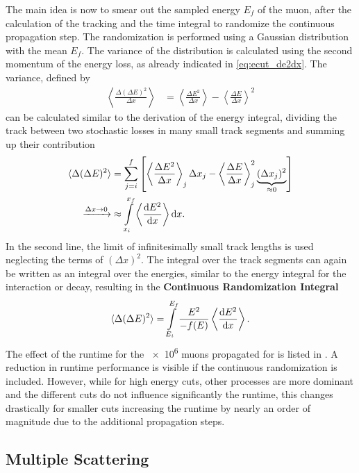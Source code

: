 The main idea is now to smear out the sampled energy $E_f$ of the muon, after the calculation of the tracking and the time integral to randomize the continuous propagation step.
The randomization is performed using a Gaussian distribution with the mean $E_f$.
The variance of the distribution is calculated using the second momentum of the energy loss, as already indicated in \eqref{eq:ecut_de2dx}.
The variance, defined by
\begin{align}
    \left\langle \frac{\Delta (\Delta E)^2}{\Delta x} \right\rangle &= \left\langle \frac{\Delta E^2}{\Delta x} \right\rangle - \left\langle \frac{\Delta E}{\Delta x} \right\rangle^2
\end{align}
can be calculated similar to the derivation of the energy integral, dividing the track between two stochastic losses in many small track segments and summing up their contribution
\begin{align}
    \langle \Delta (\Delta E)^2 \rangle
        &= \sum\limits_{j=i}^f \left[ \left\langle \frac{\Delta E^2}{\Delta x} \right\rangle_j \Delta x_j
            - \left\langle \frac{\Delta E}{\Delta x} \right\rangle_j^2 \underbrace{(\Delta x_j)^2}_{\approx 0} \right]
        \\
    \xrightarrow{\Delta x \to 0} &\approx \int\limits_{x_i}^{x_f} \left\langle \frac{\mathrm{d} E^2}{\mathrm{d} x} \right\rangle \mathrm{d} x.
\end{align}
In the second line, the limit of infinitesimally small track lengths is used neglecting the terms of $(\Delta x)^2$.
The integral over the track segments can again be written as an integral over the energies, similar to the energy integral for the interaction or decay, resulting in the \textbf{Continuous Randomization Integral}
\begin{align}
    \langle \Delta (\Delta E)^2 \rangle = \int\limits_{E_i}^{E_f} \frac{E^2}{-f(E)} \left\langle \frac{\mathrm{d} E^2}{\mathrm{d} x} \right\rangle .
\end{align}
The effect of the runtime for the \num{e6} muons propagated for  is listed in .
A reduction in runtime performance is visible if the continuous randomization is included.
However, while for high energy cuts, other processes are more dominant and the different cuts do not influence significantly the runtime, this changes drastically for smaller cuts increasing the runtime by nearly an order of magnitude due to the additional propagation steps.

%

\subsection{Multiple Scattering}

